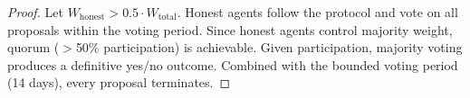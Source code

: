 \documentclass[conference]{IEEEtran}
\begin{document}
\begin{proof}
Let $W_{\text{honest}} > 0.5 \cdot W_{\text{total}}$. Honest agents follow the protocol and vote on all proposals within the voting period. Since honest agents control majority weight, quorum ($>$50\% participation) is achievable. Given participation, majority voting produces a definitive yes/no outcome. Combined with the bounded voting period (14 days), every proposal terminates.
\end{proof}
\end{document}
